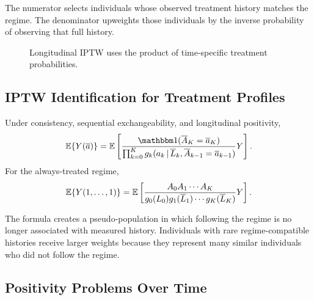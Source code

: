 The numerator selects individuals whose observed treatment history matches the
regime. The denominator upweights those individuals by the inverse probability
of observing that full history.

\begin{figure}[H]
\centering
{}
\caption{Longitudinal IPTW uses the product of time-specific treatment probabilities.}
\label{fig:ch8-longitudinal-iptw}
\end{figure}

\subsection{IPTW Identification for Treatment Profiles}

\begin{identificationbox}
Under consistency, sequential exchangeability, and longitudinal positivity,
\[
  \E\{Y(\abar)\}
  =
  \E\left[
    \frac{\ind(\Abar_K=\abar_K)}
         {\prod_{k=0}^K g_k(a_k\given \Lbar_k,\Abar_{k-1}=\abar_{k-1})}
    Y
  \right].
\]
For the always-treated regime,
\[
  \mathbb{E}\{Y(1,\ldots,1)\}
  =
  \mathbb{E}\left[
    \frac{A_0A_1\cdots A_K}
         {g_0(L_0)g_1(\overline{L}_1)\cdots g_K(\overline{L}_K)}
    Y
  \right].
\]
\end{identificationbox}

The formula creates a pseudo-population in which following the regime is no
longer associated with measured history. Individuals with rare regime-compatible
histories receive larger weights because they represent many similar individuals
who did not follow the regime.

\subsection{Positivity Problems Over Time}

